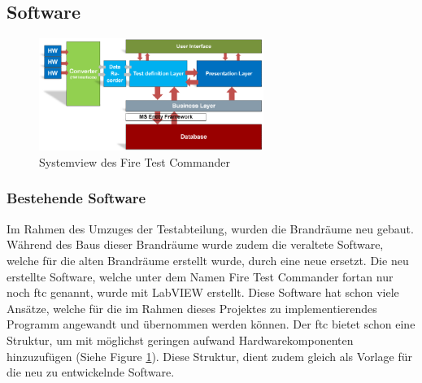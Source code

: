 \documentclass[10pt]{scrartcl}
\begin{document}
\subsection{Software}
\begin{figure}
	\begin{center}
		\includegraphics[width=0.65\textwidth]{SystemviewFTC}
		\caption{Systemview des Fire Test Commander}
		\label{fig:SystemViewFTC}
	\end{center}
\end{figure}
\subsubsection{Bestehende Software}
Im Rahmen des Umzuges der Testabteilung, wurden die Brandräume neu gebaut. Während des Baus dieser Brandräume wurde zudem die veraltete Software, welche für die alten Brandräume erstellt wurde, durch eine neue ersetzt. Die neu erstellte Software, welche unter dem Namen Fire Test Commander fortan nur noch \acrshort{ftc} genannt, wurde mit \gls{LabVIEW} erstellt. Diese Software hat schon viele Ansätze, welche für die im Rahmen dieses Projektes zu implementierendes Programm angewandt und übernommen werden können. Der \acrshort{ftc} bietet schon eine Struktur, um mit möglichst geringen aufwand Hardwarekomponenten hinzuzufügen (Siehe Figure \ref{fig:SystemViewFTC}). Diese Struktur, dient zudem gleich als Vorlage für die neu zu entwickelnde Software.
\newpage
\end{document}
